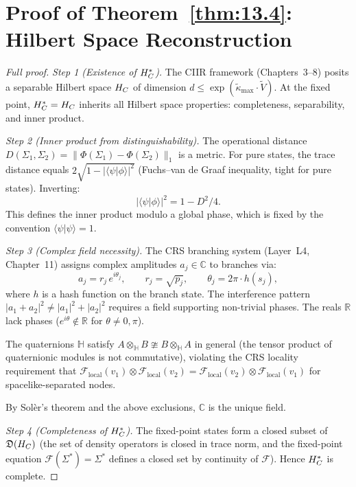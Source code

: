 \section{Proof of Theorem~\ref{thm:13.4}: Hilbert Space Reconstruction}
\label{app:pf-hilbert}

\begin{proof}[Full proof]
\emph{Step 1 (Existence of $H_C^*$).}
The CIIR framework (Chapters~3--8) posits a separable Hilbert space
$H_C$ of dimension $d \leq \exp(\tilde{\kappa}_{\max} \cdot \tilde{V})$.
At the fixed point, $H_C^* = H_C$ inherits all Hilbert space properties:
completeness, separability, and inner product.

\emph{Step 2 (Inner product from distinguishability).}
The operational distance $D(\Sigma_1, \Sigma_2) =
\|\Phi(\Sigma_1) - \Phi(\Sigma_2)\|_1$ is a metric.  For pure states,
the trace distance equals $2\sqrt{1 - |\langle\psi|\phi\rangle|^2}$
(Fuchs--van de Graaf inequality, tight for pure states).  Inverting:
\[
  |\langle\psi|\phi\rangle|^2 = 1 - D^2/4.
\]
This defines the inner product modulo a global phase, which is
fixed by the convention $\langle\psi|\psi\rangle = 1$.

\emph{Step 3 (Complex field necessity).}
The CRS branching system (Layer~L4, Chapter~11) assigns complex
amplitudes $a_j \in \mathbb{C}$ to branches via:
\[
  a_j = r_j\,e^{i\theta_j},
  \qquad r_j = \sqrt{p_j},
  \qquad \theta_j = 2\pi \cdot h(s_j),
\]
where $h$ is a hash function on the branch state.  The interference
pattern $|a_1 + a_2|^2 \neq |a_1|^2 + |a_2|^2$ requires a field
supporting non-trivial phases.  The reals $\mathbb{R}$ lack phases
($e^{i\theta} \notin \mathbb{R}$ for $\theta \neq 0, \pi$).

The quaternions $\mathbb{H}$ satisfy $A \otimes_{\mathbb{H}} B
\ncong B \otimes_{\mathbb{H}} A$ in general (the tensor product of
quaternionic modules is not commutative), violating the CRS locality
requirement that $\mathcal{F}_{\mathrm{local}}(v_1) \otimes
\mathcal{F}_{\mathrm{local}}(v_2) = \mathcal{F}_{\mathrm{local}}(v_2)
\otimes \mathcal{F}_{\mathrm{local}}(v_1)$ for spacelike-separated
nodes.

By Sol\`er's theorem and the above exclusions, $\mathbb{C}$ is the
unique field.

\emph{Step 4 (Completeness of $H_C^*$).}
The fixed-point states form a closed subset of $\mathfrak{D}(H_C)$
(the set of density operators is closed in trace norm, and the
fixed-point equation $\mathcal{F}(\Sigma^*) = \Sigma^*$ defines a
closed set by continuity of $\mathcal{F}$).  Hence $H_C^*$ is complete.
\end{proof}


